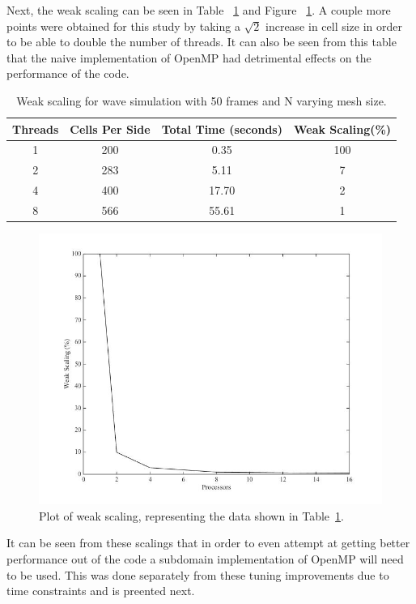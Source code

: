 \documentclass[12pt]{article}
\begin{document}
Next, the weak scaling can be seen in Table ~\ref{wscale_c} and Figure ~\ref{wsplot_c}. A couple more points were obtained for this study by taking a $\sqrt{2}$ increase in cell size in order to be able to double the number of threads. It can also be seen from this table that the naive implementation of OpenMP had detrimental effects on the performance of the code.

\begin{table}[h]
	\begin{center}
		\begin{tabular}{|c c c c|}
			\hline
			Threads & Cells Per Side & Total Time (seconds) & Weak Scaling(\%) \\ \hline
			1 & 200 & 0.35 & 100   \\ \hline
			2 & 283 & 5.11 & 7 \\ \hline
			4 & 400 & 17.70 & 2   \\ \hline
			8 & 566 & 55.61 & 1   \\ \hline
		\end{tabular}
		\caption{Weak scaling for wave simulation with 50 frames and N varying mesh size.}
		\label{wscale_c}
	\end{center}
\end{table}

		\begin{figure}[h]
			\begin{center}
				\includegraphics[width=0.5\columnwidth]{wscale_plot}
				\caption{Plot of weak scaling, representing the data shown in Table~\ref{wscale_c}.}
				\label{wsplot_c}
			\end{center}
		\end{figure}

It can be seen from these scalings that in order to even attempt at getting better performance out of the code a subdomain implementation of OpenMP will need to be used. This was done separately from these tuning improvements due to time constraints and is preented next.
\end{document}
